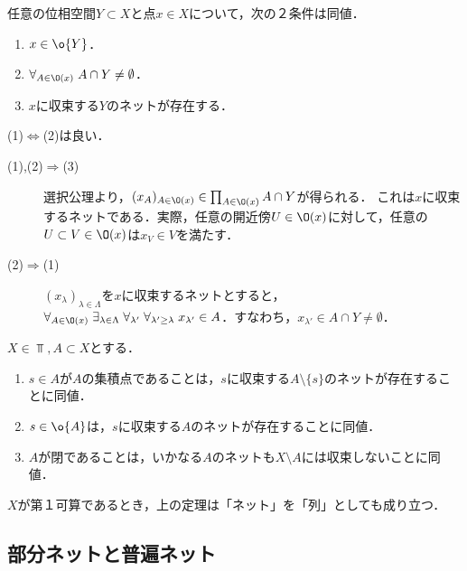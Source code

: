 \documentclass[uplatex,dvipdfmx]{jsreport}
\begin{document}
\begin{proposition}[(AC)]
    任意の位相空間$Y\subset X$と点$x\in X$について，次の２条件は同値．
    \begin{enumerate}
        \item $x\in\o{Y}$．
        \item $\forall_{A\in\O(x)}\;A\cap Y\ne\emptyset$．
        \item $x$に収束する$Y$のネットが存在する．
    \end{enumerate}
\end{proposition}
\begin{Proof}
    (1)$\Leftrightarrow$(2)は良い．
    \begin{description}
        \item[(1),(2)$\Rightarrow$(3)] 選択公理より，$(x_A)_{A\in\O(x)}\in\prod_{A\in\O(x)}A\cap Y$が得られる．
        これは$x$に収束するネットである．実際，任意の開近傍$U\in\O(x)$に対して，任意の$U\subset V\in\O(x)$は$x_V\in V$を満たす．
        \item[(2)$\Rightarrow$(1)] $(x_\lambda)_{\lambda\in\Lambda}$を$x$に収束するネットとすると，$\forall_{A\in\O(x)}\;\exists_{\lambda\in\Lambda}\;\forall_{\lambda'}\;\forall_{\lambda'\ge\lambda}\;x_{\lambda'}\in A$．すなわち，$x_{\lambda'}\in A\cap Y\ne\emptyset$．
    \end{description}
\end{Proof}

\begin{theorem}
    $X\in\Top,A\subset X$とする．
    \begin{enumerate}
        \item $s\in A$が$A$の集積点であることは，$s$に収束する$A\setminus\{s\}$のネットが存在することに同値．
        \item $s\in\o{A}$は，$s$に収束する$A$のネットが存在することに同値．
        \item $A$が閉であることは，いかなる$A$のネットも$X\setminus A$には収束しないことに同値．
    \end{enumerate}
\end{theorem}

\begin{theorem}
    $X$が第１可算であるとき，上の定理は「ネット」を「列」としても成り立つ．
\end{theorem}

\subsection{部分ネットと普遍ネット}
\end{document}
